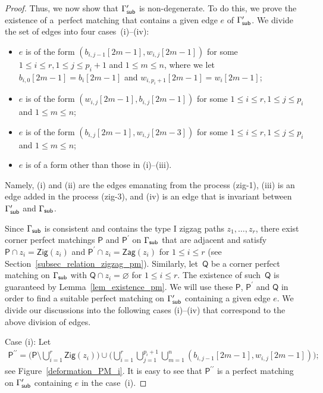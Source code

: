 \documentclass[pdftex]{sigma}%
\numberwithin{equation}{section}
\numberwithin{figure}{section}
\numberwithin{table}{section}
\newcommand{\sfP}{\mathsf{P}}
\newcommand{\sfQ}{\mathsf{Q}}
\newcommand{\Zig}{\mathsf{Zig}}
\newcommand{\Zag}{\mathsf{Zag}}
\begin{document}
\begin{proof}
Thus, we now show that $\Gamma^\prime_{\sf sub}$ is non-degenerate.
To do this, we prove the existence of a~perfect matching that contains a given edge $e$ of $\Gamma^\prime_{\sf sub}$.
We divide the set of edges into four cases~(i)--(iv):
\begin{itemize}\itemsep=0pt
\item[(i)] $e$ is of the form $(b_{i,j-1}[2m-1], w_{i,j}[2m-1])$ for some $1 \leq i \leq r, 1 \leq j \leq p_i+1$ and $1 \leq m \leq n$,
where we let $b_{i,0}[2m-1]=b_i[2m-1]$ and $w_{i,p_i+1}[2m-1]=w_i[2m-1]$;
\item[(ii)] $e$ is of the form $(w_{i,j}[2m-1], b_{i,j}[2m-1])$ for some $1 \leq i \leq r, 1 \leq j \leq p_i$ and $1 \leq m \leq n$;
\item[(iii)] $e$ is of the form $(b_{i,j}[2m-1],w_{i,j}[2m-3])$ for some $1 \leq i \leq r, 1 \leq j \leq p_i$ and $1 \leq m \leq n$;
\item[(iv)] $e$ is of a form other than those in (i)--(iii).
\end{itemize}
Namely, (i) and (ii) are the edges emanating from the process (zig-1), (iii) is an edge added in the process (zig-3), and (iv) is an edge that is invariant between $\Gamma^\prime_{\sf sub}$ and $\Gamma_{\sf sub}$.

Since $\Gamma_{\sf sub}$ is consistent and contains the type I zigzag paths $z_1,\dots,z_r$,
there exist corner perfect matchings $\sfP$ and $\sfP^\prime$ on $\Gamma_{\sf sub}$ that are adjacent and satisfy $\sfP \cap z_i=\Zig(z_i)$ and $\sfP^\prime \cap z_i=\Zag(z_i)$ for $1 \leq i \leq r$ (see Section~\ref{subsec_relation_zigzag_pm}).
Similarly, let~$\sfQ$ be a corner perfect matching on $\Gamma_{\sf sub}$ with $\sfQ \cap z_i = \varnothing$ for $1 \leq i \leq r$.
The existence of such~$\sfQ$ is guaranteed by Lemma~\ref{lem_existence_pm}.
We will use these $\sfP$, $\sfP^\prime$ and $\sfQ$ in order to find a suitable perfect matching on $\Gamma^\prime_{\sf sub}$ containing a given edge $e$.
We divide our discussions into the following cases (i)--(iv) that correspond to the above division of edges.

Case (i): Let \begin{gather}\label{PM_case(i)}
\sfP^{\prime\prime}=\bigg(\sfP \setminus \bigcup_{i=1}^r \Zig(z_i)\bigg) \cup \bigg(\bigcup_{i=1}^r \bigcup_{j=1}^{p_i+1} \bigcup_{m=1}^n(b_{i,j-1}[2m-1],w_{i,j}[2m-1])\bigg);
\end{gather}
see Figure~\ref{deformation_PM_i}. It is easy to see that $\sfP^{\prime\prime}$ is a perfect matching on $\Gamma^\prime_{\sf sub}$ containing $e$ in the case~(i).


\end{proof}
\end{document}
